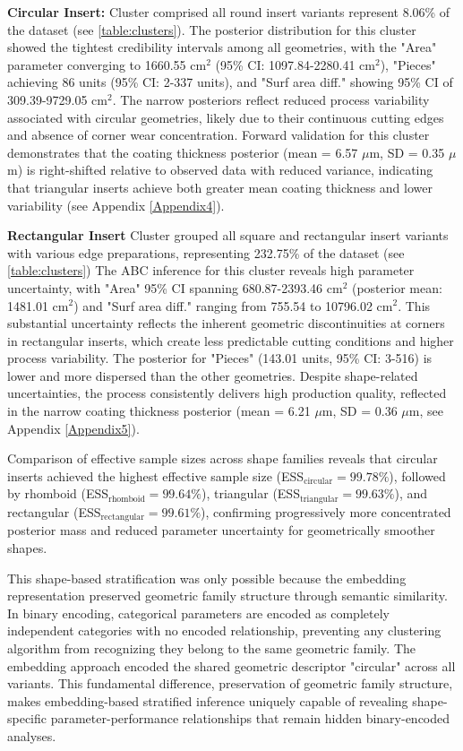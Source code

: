 \documentclass{article}
\begin{document}
	
	\textbf{Circular Insert:} Cluster comprised all round insert variants represent 8.06\% of the dataset (see \cref{table:clusters}). The posterior distribution for this cluster showed the tightest credibility intervals among all geometries, with the "Area" parameter converging to 1660.55 cm$^2$ (95\% CI: 1097.84-2280.41 cm$^2$), "Pieces" achieving 86 units (95\% CI: 2-337 units), and "Surf area diff." showing 95\% CI of 309.39-9729.05 cm$^2$. The narrow posteriors reflect reduced process variability associated with circular geometries, likely due to their continuous cutting edges and absence of corner wear concentration. Forward validation for this cluster demonstrates that the coating thickness posterior (mean = 6.57 $\mu$m, SD = 0.35 $\mu$m) is right-shifted relative to observed data with reduced variance, indicating that triangular inserts achieve both greater mean coating thickness and lower variability (see Appendix \ref{Appendix4}).
	
	\textbf{Rectangular Insert} Cluster grouped all square and rectangular insert variants with various edge preparations, representing 232.75\% of the dataset (see \cref{table:clusters}) The ABC inference for this cluster reveals high parameter uncertainty, with "Area" 95\% CI spanning 680.87-2393.46 cm$^2$ (posterior mean: 1481.01 cm$^2$) and "Surf area diff." ranging from 755.54 to 10796.02 cm$^2$. This substantial uncertainty reflects the inherent geometric discontinuities at corners in rectangular inserts, which create less predictable cutting conditions and higher process variability. The posterior for "Pieces" (143.01 units, 95\% CI: 3-516) is lower and more dispersed than the other geometries. Despite shape-related uncertainties, the process consistently delivers high production quality, reflected in the narrow coating thickness posterior (mean = 6.21 $\mu$m, SD = 0.36 $\mu$m, see Appendix \ref{Appendix5}).
	
	Comparison of effective sample sizes across shape families reveals that circular inserts achieved the highest effective sample size (ESS$_{\text{circular}} = 99.78\%$), followed by rhomboid (ESS$_{\text{rhomboid}} = 99.64\%$), triangular (ESS$_{\text{triangular}} = 99.63\%$), and rectangular (ESS$_\text{rectangular} = 99.61\%$), confirming progressively more concentrated posterior mass and reduced parameter uncertainty for geometrically smoother shapes.
	
	This shape-based stratification was only possible because the embedding representation preserved geometric family structure through semantic similarity. In binary encoding, categorical parameters are encoded as completely independent categories with no encoded relationship, preventing any clustering algorithm from recognizing they belong to the same geometric family. The embedding approach encoded the shared geometric descriptor "circular" across all variants. This fundamental difference, preservation of geometric family structure, makes embedding-based stratified inference uniquely capable of revealing shape-specific parameter-performance relationships that remain hidden binary-encoded analyses.
\end{document}
